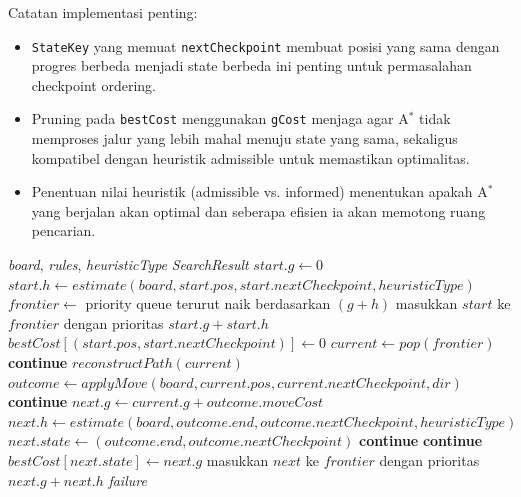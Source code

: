 Catatan implementasi penting:
\begin{itemize}
    \item \texttt{StateKey} yang memuat \texttt{nextCheckpoint} membuat posisi yang sama dengan progres berbeda menjadi state berbeda  ini penting untuk permasalahan checkpoint ordering.
    \item Pruning pada \texttt{bestCost} menggunakan \texttt{gCost} menjaga agar A$^\ast$ tidak memproses jalur yang lebih mahal menuju state yang sama, sekaligus kompatibel dengan heuristik admissible untuk memastikan optimalitas.
    \item Penentuan nilai heuristik (admissible vs.
          informed) menentukan apakah A$^\ast$ yang berjalan akan optimal dan seberapa efisien ia akan memotong ruang pencarian.
\end{itemize}

\begin{algorithm}[H]
    \caption{A* Search pada Solver}
    \begin{algorithmic}[1]
        \Require \textit{board}, \textit{rules}, \textit{heuristicType}
        \Ensure \textit{SearchResult}
        \State $start.g \gets 0$
        \State $start.h \gets estimate(board, start.pos, start.nextCheckpoint, heuristicType)$
        \State $frontier \gets$ priority queue terurut naik berdasarkan $(g+h)$
        \State masukkan $start$ ke $frontier$ dengan prioritas $start.g + start.h$
        \State $bestCost[(start.pos, start.nextCheckpoint)] \gets 0$
        \State $current \gets pop(frontier)$
        \State \textbf{continue}
        \EndIf
        \State \Return $reconstructPath(current)$
        \EndIf
        \State $outcome \gets applyMove(board, current.pos, current.nextCheckpoint, dir)$
        \State \textbf{continue}
        \EndIf
        \State $next.g \gets current.g + outcome.moveCost$
        \State $next.h \gets estimate(board, outcome.end, outcome.nextCheckpoint, heuristicType)$
        \State $next.state \gets (outcome.end, outcome.nextCheckpoint)$
        \State \textbf{continue}
        \EndIf
        \State \textbf{continue}
        \EndIf
        \State $bestCost[next.state] \gets next.g$
        \State masukkan $next$ ke $frontier$ dengan prioritas $next.g + next.h$
        \EndFor
        \EndWhile
        \State \Return \textit{failure}
    \end{algorithmic}
\end{algorithm}

